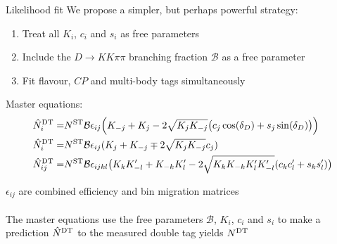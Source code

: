 \documentclass{beamer}
\begin{document}
\begin{frame}{Likelihood fit}
  \vspace{0.0cm}
  {\Large We propose a simpler, but perhaps powerful strategy:}
  \begin{enumerate}
    \item{Treat all $K_i$, $c_i$ and $s_i$ as free parameters}
    \item{Include the $D\to KK\pi\pi$ branching fraction $\mathcal{B}$ as a free parameter}
    \item{Fit flavour, $C\!P$ and multi-body tags simultaneously}
  \end{enumerate}
  \begin{center}
    {\Large Master equations:}
    \begin{align*}
      \hat{N}^{\rm DT}_i =& N^{\rm ST}\mathcal{B}\epsilon_{ij}\Big(K_{-j} + K_j - 2\sqrt{K_jK_{-j}}\big(c_j\cos(\delta_D) + s_j\sin(\delta_D)\big)\Big) \\
      \hat{N}^{\rm DT}_i =& N^{\rm ST}\mathcal{B}\epsilon_{ij}(K_j + K_{-j} \mp 2\sqrt{K_jK_{-j}}c_j) \\
      \hat{N}^{\rm DT}_{ij} =& N^{\rm ST}\mathcal{B}\epsilon_{ijkl}\big(K_{k}K_{-l}^\prime + K_{-k}K_{l}^\prime - 2\sqrt{K_{k}K_{-k}K_{l}^\prime K_{-l}^\prime}(c_{k}c_{l}^\prime + s_{k}s_{l}^\prime)\big)
    \end{align*}
  \end{center}
  \begin{center}
    $\epsilon_{ij}$ are combined efficiency and bin migration matrices\\~\\
    {\large The master equations use the free parameters $\mathcal{B}$, $K_i$, $c_i$ and $s_i$ to make a prediction $\hat{N}^{\rm DT}$ to the measured double tag yields $N^{\rm DT}$}
  \end{center}
\end{frame}
\end{document}
